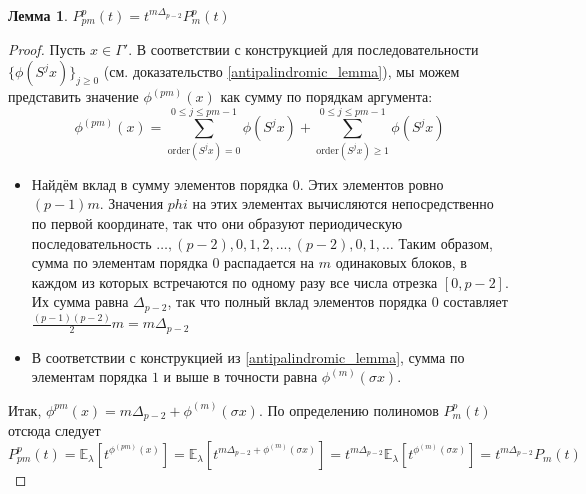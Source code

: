 \documentclass[14pt, a4paper, russian]{report}
\newtheorem{lemma}{\indent Лемма}
\begin{document}
\begin{lemma}\label{simple_case} $P_{pm}^p(t)=t^{m\Delta_{p-2}}P_m^p(t)$
\end{lemma}
\begin{proof}
Пусть $x \in \Gamma'$. В соответствии с конструкцией для последовательности $\{\phi(S^j x)\}_{j \ge 0}$ (см. доказательство \cref{antipalindromic_lemma}), мы можем представить значение $\phi^{(pm)}(x)$ как сумму по порядкам аргумента: 
$$ \phi^{(pm)}(x) = \sum\limits_{\mathrm{order}(S^j x) = 0}^{0 \le j \le pm-1}\phi(S^j x) + \sum\limits_{\mathrm{order}(S^j x) \ge 1}^{0 \le j \le pm-1} \phi(S^j x)$$
\begin{itemize}
\item Найдём вклад в сумму элементов порядка $0$. Этих элементов ровно $(p-1)m$. Значения $phi$ на этих элементах вычисляются непосредственно по первой координате, так что они образуют периодическую последовательность $\ldots,(p-2),0,1,2,...,(p-2),0,1,\ldots$ Таким образом, сумма по элементам порядка $0$ распадается на $m$ одинаковых блоков, в каждом из которых встречаются по одному разу все числа отрезка $\left[ 0, p-2 \right]$. Их сумма равна $\Delta_{p-2}$, так что полный вклад элементов порядка $0$ составляет $\frac{(p-1)(p-2)}{2}m=m\Delta_{p-2}$
\item В соответствии с конструкцией из \cref{antipalindromic_lemma}, сумма по элементам порядка $1$ и выше в точности равна $\phi^{(m)}(\sigma x)$.
\end{itemize}
Итак, $\phi^{pm}(x) = m\Delta_{p-2} + \phi^{(m)}(\sigma x)$. По определению полиномов $P_m^p(t)$ отсюда следует 
$$P_{pm}^p(t) = \mathbb{E}_\lambda\left[ t^{\phi^{(pm)}(x)}\right] = 
\mathbb{E}_\lambda\left[ t^{m\Delta_{p-2} + \phi^{(m)}(\sigma x)}\right] = 
t^{m\Delta_{p-2}} \mathbb{E}_\lambda \left[ t^{\phi^{(m)} (\sigma x)}  \right] = 
t^{m\Delta_{p-2} }P_m(t)$$
\end{proof}
\end{document}
